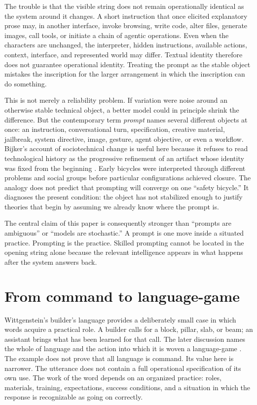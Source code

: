 \documentclass[11pt]{article}
\begin{document}
The trouble is that the visible string does not remain operationally identical as the system around it changes. A short instruction that once elicited explanatory prose may, in another interface, invoke browsing, write code, alter files, generate images, call tools, or initiate a chain of agentic operations. Even when the characters are unchanged, the interpreter, hidden instructions, available actions, context, interface, and represented world may differ. Textual identity therefore does not guarantee operational identity. Treating the prompt as the stable object mistakes the inscription for the larger arrangement in which the inscription can do something.

This is not merely a reliability problem. If variation were noise around an otherwise stable technical object, a better model could in principle shrink the difference. But the contemporary term \emph{prompt} names several different objects at once: an instruction, conversational turn, specification, creative material, jailbreak, system directive, image, gesture, agent objective, or even a workflow. Bijker's account of sociotechnical change is useful here because it refuses to read technological history as the progressive refinement of an artifact whose identity was fixed from the beginning \citep{bijker1995}. Early bicycles were interpreted through different problems and social groups before particular configurations achieved closure. The analogy does not predict that prompting will converge on one ``safety bicycle.'' It diagnoses the present condition: the object has not stabilized enough to justify theories that begin by assuming we already know where the prompt is.

The central claim of this paper is consequently stronger than ``prompts are ambiguous'' or ``models are stochastic.'' A prompt is one move inside a situated practice. Prompting is the practice. Skilled prompting cannot be located in the opening string alone because the relevant intelligence appears in what happens after the system answers back.

\section{From command to language-game}
Wittgenstein's builder's language provides a deliberately small case in which words acquire a practical role. A builder calls for a block, pillar, slab, or beam; an assistant brings what has been learned for that call. The later discussion names the whole of language and the action into which it is woven a language-game \citep{wittgenstein2009}. The example does not prove that all language is command. Its value here is narrower. The utterance does not contain a full operational specification of its own use. The work of the word depends on an organized practice: roles, materials, training, expectations, success conditions, and a situation in which the response is recognizable as going on correctly.
\end{document}
